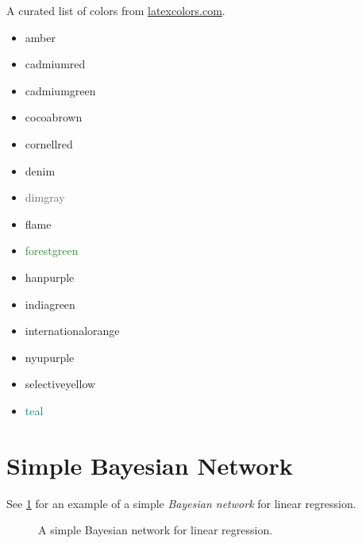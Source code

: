 \documentclass{article}
\begin{document}
A curated list of colors from \url{latexcolors.com}.

\begin{itemize}
	\item \textcolor{amber}{amber}
	\item \textcolor{cadmiumred}{cadmiumred}
	\item \textcolor{cadmiumgreen}{cadmiumgreen}
	\item \textcolor{cocoabrown}{cocoabrown}
	\item \textcolor{cornellred}{cornellred}
	\item \textcolor{denim}{denim}
	\item \textcolor{dimgray}{dimgray}
	\item \textcolor{flame}{flame}
	\item \textcolor{forestgreen}{forestgreen}
	\item \textcolor{hanpurple}{hanpurple}
	\item \textcolor{indiagreen}{indiagreen}
	\item \textcolor{internationalorange}{internationalorange}
	\item \textcolor{nyupurple}{nyupurple}
	\item \textcolor{selectiveyellow}{selectiveyellow}
	\item \textcolor{teal}{teal}
\end{itemize}

\section{Simple Bayesian Network}

See \cref{fig:bayes_net} for an example of a simple \emph{Bayesian network} for linear regression.

\begin{figure}[!ht]
    \centering
{}
    \caption{A simple Bayesian network for linear regression.}
    \label{fig:bayes_net}
\end{figure}
\end{document}
